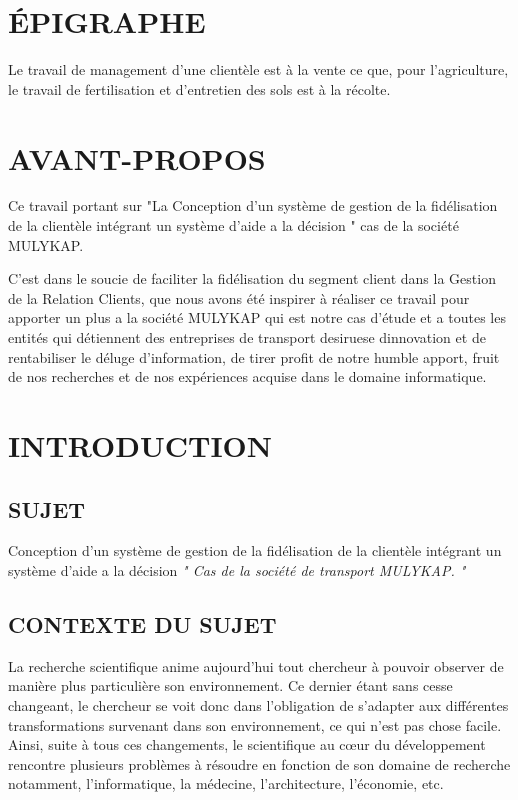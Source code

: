 \documentclass[a4paper,12pt,oneside]{book}
\begin{document}
\frontmatter
\chapter*{ÉPIGRAPHE}
Le travail de management d’une clientèle est à la vente ce
que, pour l’agriculture, le travail de fertilisation et
d’entretien des sols est à la récolte.

\chapter*{AVANT-PROPOS}
Ce travail portant sur "La Conception d’un système de gestion de la fidélisation
de la clientèle intégrant un système d’aide a la décision
" cas de la société MULYKAP.
\newline

C’est dans le soucie de faciliter la fidélisation du segment client
dans la Gestion de la Relation Clients, que nous avons été inspirer
à réaliser ce travail pour apporter un plus a la société MULYKAP
qui est notre cas d’étude et a toutes les entités qui détiennent des entreprises de transport desiruese dinnovation et de rentabiliser le 
déluge d’information, de tirer profit de notre humble apport, fruit
de nos recherches et de nos expériences acquise dans le domaine informatique.

\mainmatter

\chapter*{INTRODUCTION}
\section[Sujet]{SUJET}
Conception d’un système de gestion de la fidélisation
de la clientèle intégrant un système d’aide a la décision 
\textit{" Cas de la société de transport MULYKAP. "}
\section[Context du sujet]{CONTEXTE DU SUJET}
La recherche scientifique anime aujourd’hui tout chercheur 
à pouvoir observer de manière
plus particulière son environnement. Ce dernier étant 
sans cesse changeant, le chercheur se voit donc
dans l’obligation de s’adapter aux différentes transformations
survenant dans son environnement, ce qui n’est pas chose facile.
Ainsi, suite à tous ces changements, le scientifique au cœur du
développement rencontre plusieurs problèmes à résoudre en 
fonction de son domaine de recherche notamment, l’informatique,
la médecine, l’architecture, l’économie, etc.
\newline
\end{document}

